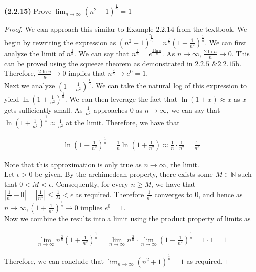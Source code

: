 \documentclass[12pt]{article}
\newcommand{\limtoinf}[1]{\lim_{ {#1} \to\infty}}
\newcommand{\abs}[1]{\left| {#1} \right|}
\newcommand{\paren}[1]{\left( {#1} \right)}
\newcommand{\bN}{\mathbb{N}}
\begin{document}
\newpage

\noindent \textbf{(2.2.15)} Prove $\limtoinf{n}\paren{n^2+1}^\frac{1}{n}=1$

\begin{proof}
	We can approach this similar to $\underline{\text{Example 2.2.14}}$ from the textbook. We begin by rewriting the expression as $\paren{n^2+1}^\frac{1}{n}=n^{\frac{2}{n}}\paren{1+\frac{1}{n^2}}^\frac{1}{n}$. We can first analyze the limit of $n^\frac{2}{n}$. We can say that $n^\frac{2}{n}=e^\frac{2\ln{n}}{n}$. As $n\to\infty$, $\frac{2\ln{n}}{n}\to0$. This can be proved using the squeeze theorem as demonstrated in $\underline{\text{2.2.5 \& 2.2.15b}}$. Therefore, $\frac{2\ln{n}}{n}\to0$ implies that $n^\frac{2}{n}\to e^0=1$. \\
	
\indent Next we analyze $\paren{1+\frac{1}{n^2}}^\frac{1}{n}$. We can take the natural log of this expression to yield $\ln{\paren{1+\frac{1}{n^2}}^\frac{1}{n}}$. We can then leverage the fact that $\ln\paren{1+x}\approx x$ as $x$ gets sufficiently small. As $\frac{1}{n^2}$ approaches 0 as $n\to\infty$, we can say that $\ln{\paren{1+\frac{1}{n^2}}^\frac{1}{n}}\approx\frac{1}{n^2}$ at the limit. Therefore, we have that 

\begin{align*}
	\ln{\paren{1+\frac{1}{n^2}}^\frac{1}{n}}=\frac{1}{n}\ln{\paren{1+\frac{1}{n^2}}}\approx\frac{1}{n}\cdot\frac{1}{n^2}=\frac{1}{n^3}
\end{align*}

\noindent Note that this approximation is only true as $n\to\infty$, the limit. \\

\indent Let $\epsilon>0$ be given. By the archimedean property, there exists some $M\in\bN$ such that $0<M<\epsilon$. Consequently, for every $n\ge M$, we have that $\abs{\frac{1}{n^3}-0}=\abs{\frac{1}{n^3}}\le\frac{1}{M	}<\epsilon$ as required. Therefore $\frac{1}{n^3}$ converges to 0, and hence as $n\to\infty, \paren{1+\frac{1}{n^2}}^\frac{1}{n}\to0$ implies $e^0=1$. \\

\indent Now we combine the results into a limit using the product property of limits as

\begin{align*}
	\limtoinf{n} n^{\frac{2}{n}}\paren{1+\frac{1}{n^2}}^\frac{1}{n}=\limtoinf{n}n^{\frac{2}{n}}\cdot\limtoinf{n}\paren{1+\frac{1}{n^2}}^\frac{1}{n}=1\cdot1=1
\end{align*}

\noindent Therefore, we can conclude that $\limtoinf{n}\paren{n^2+1}^\frac{1}{n}=1$ as required.

\end{proof}

\newpage
\end{document}
